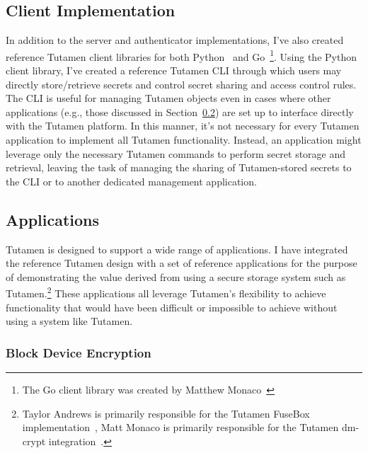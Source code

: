 \subsection{Client Implementation}
\label{chap:tutamen:imp:client}

In addition to the server and authenticator implementations, I've also
created reference Tutamen client libraries for both
Python~\cite{src-tutamen-pytutamen} and
Go~\cite{src-tutamen-go}\footnote{The Go client library was created by
  Matthew Monaco~\cite{src-tutamen-go}}. Using the Python client
library, I've created a reference Tutamen CLI through which users may
directly store/retrieve secrets and control secret sharing and access
control rules. The CLI is useful for managing Tutamen objects even in
cases where other applications (e.g., those discussed in
Section~\ref{chap:tutamen:imp:apps}) are set up to interface directly
with the Tutamen platform. In this manner, it's not necessary for
every Tutamen application to implement all Tutamen
functionality. Instead, an application might leverage only the
necessary Tutamen commands to perform secret storage and retrieval,
leaving the task of managing the sharing of Tutamen-stored secrets to
the CLI or to another dedicated management application.

\subsection{Applications}
\label{chap:tutamen:imp:apps}

Tutamen is designed to support a wide range of applications. I have
integrated the reference Tutamen design with a set of reference
applications for the purpose of demonstrating the value derived from
using a secure storage system such as Tutamen.\footnote{Taylor Andrews
  is primarily responsible for the Tutamen FuseBox
  implementation~\cite{fusebox}, Matt Monaco is primarily responsible
  for the Tutamen dm-crypt
  integration~\cite{src-tutamen-askpassword}.} These applications all
leverage Tutamen's flexibility to achieve functionality that would
have been difficult or impossible to achieve without using a system
like Tutamen.

\subsubsection{Block Device Encryption}

